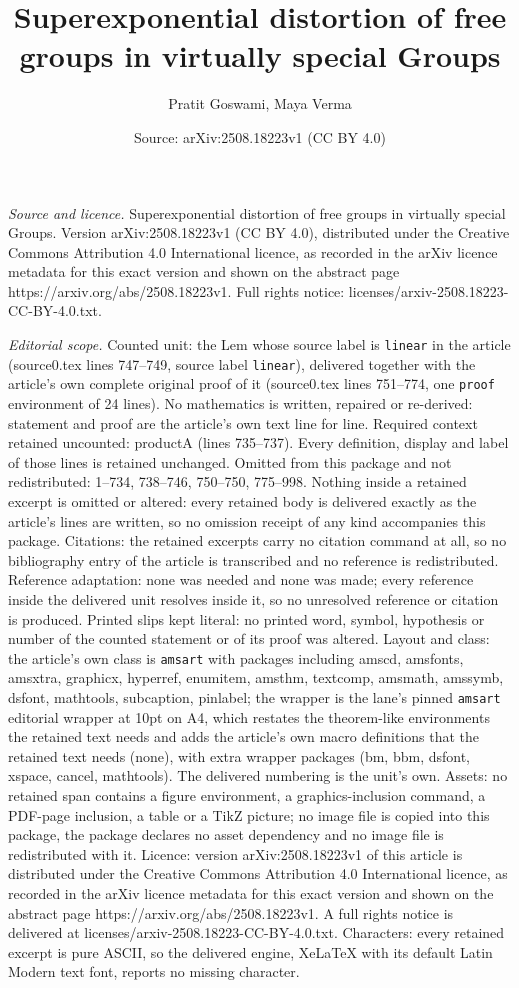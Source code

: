 \documentclass[10pt,a4paper]{amsart}
\title[Superexponential distortion of free groups in virtually spec]{Superexponential distortion of free groups in virtually special Groups}
\author{Pratit Goswami, Maya Verma}
\date{Source: arXiv:2508.18223v1 (CC BY 4.0)}
\begin{document}
\maketitle

\noindent\emph{Source and licence.} Superexponential distortion of free groups in virtually special Groups. Version arXiv:2508.18223v1 (CC BY 4.0), distributed under the Creative Commons Attribution 4.0 International licence, as recorded in the arXiv licence metadata for this exact version and shown on the abstract page https://arxiv.org/abs/2508.18223v1. Full rights notice: licenses/arxiv-2508.18223-CC-BY-4.0.txt.\par\smallskip

\noindent\textit{Editorial scope.} Counted unit: the Lem whose source label is \texttt{linear} in the article (source0.tex lines 747--749, source label \texttt{linear}), delivered together with the article's own complete original proof of it (source0.tex lines 751--774, one \texttt{proof} environment of 24 lines). No mathematics is written, repaired or re-derived: statement and proof are the article's own text line for line. Required context retained uncounted: productA (lines 735--737). Every definition, display and label of those lines is retained unchanged. Omitted from this package and not redistributed: 1--734, 738--746, 750--750, 775--998. Nothing inside a retained excerpt is omitted or altered: every retained body is delivered exactly as the article's lines are written, so no omission receipt of any kind accompanies this package. Citations: the retained excerpts carry no citation command at all, so no bibliography entry of the article is transcribed and no reference is redistributed. Reference adaptation: none was needed and none was made; every reference inside the delivered unit resolves inside it, so no unresolved reference or citation is produced. Printed slips kept literal: no printed word, symbol, hypothesis or number of the counted statement or of its proof was altered. Layout and class: the article's own class is \texttt{amsart} with packages including amscd, amsfonts, amsxtra, graphicx, hyperref, enumitem, amsthm, textcomp, amsmath, amssymb, dsfont, mathtools, subcaption, pinlabel; the wrapper is the lane's pinned \texttt{amsart} editorial wrapper at 10pt on A4, which restates the theorem-like environments the retained text needs and adds the article's own macro definitions that the retained text needs (none), with extra wrapper packages (bm, bbm, dsfont, xspace, cancel, mathtools). The delivered numbering is the unit's own. Assets: no retained span contains a figure environment, a graphics-inclusion command, a PDF-page inclusion, a table or a TikZ picture; no image file is copied into this package, the package declares no asset dependency and no image file is redistributed with it. Licence: version arXiv:2508.18223v1 of this article is distributed under the Creative Commons Attribution 4.0 International licence, as recorded in the arXiv licence metadata for this exact version and shown on the abstract page https://arxiv.org/abs/2508.18223v1. A full rights notice is delivered at licenses/arxiv-2508.18223-CC-BY-4.0.txt. Characters: every retained excerpt is pure ASCII, so the delivered engine, XeLaTeX with its default Latin Modern text font, reports no missing character.
\end{document}
